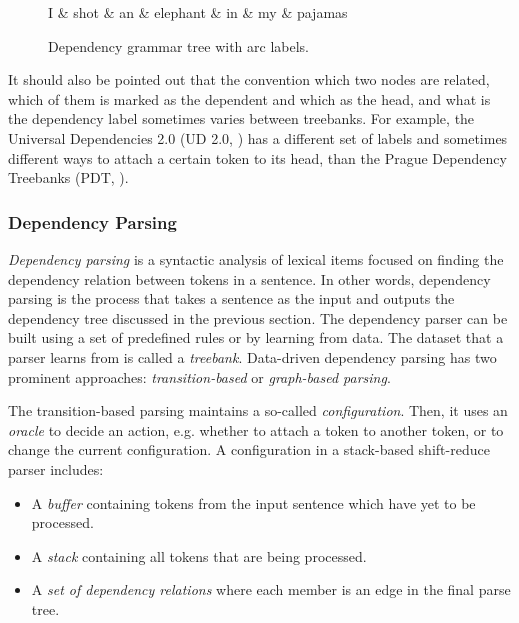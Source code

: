 \begin{figure}[t]
    \centering
    \begin{dependency}
        \begin{deptext}
        I \& shot \& an \& elephant \& in \& my \& pajamas \\
        \end{deptext}
    \end{dependency}
    \caption{Dependency grammar tree with arc labels.}
    \label{fig:dependency_tree_label}
\end{figure}

It should also be pointed out that the convention which two nodes are related, which of them is marked as the dependent and which as the head, and what is the dependency label sometimes varies between treebanks.
For example, the Universal Dependencies 2.0 (UD 2.0, \cite{UD20}) has a different set of labels and sometimes different ways to attach a certain token to its head, than the Prague Dependency Treebanks (PDT, \cite{pdt20:2006}).

\subsubsection{Dependency Parsing}
\label{the-ling-dep-parse}
\textit{Dependency parsing} is a syntactic analysis of lexical items focused on finding the dependency relation between tokens in a sentence.
In other words, dependency parsing is the process that takes a sentence as the input and outputs the dependency tree discussed in the previous section.
The dependency parser can be built using a set of predefined rules or by learning from data.
The dataset that a parser learns from is called a \textit{treebank}.
Data-driven dependency parsing has two prominent approaches: \textit{transition-based} or \textit{graph-based parsing}.

The transition-based parsing maintains a so-called \textit{configuration}. Then, it uses an \textit{oracle} to decide an action, e.g. whether to attach a token to another token, or to change the current configuration. A configuration in a stack-based shift-reduce parser includes:

\begin{itemize}
    \item A \textit{buffer} containing tokens from the input sentence which have yet to be processed.
    \item A \textit{stack} containing all tokens that are being processed.
    \item A \textit{set of dependency relations} where each member is an edge in the final parse tree.
\end{itemize}

